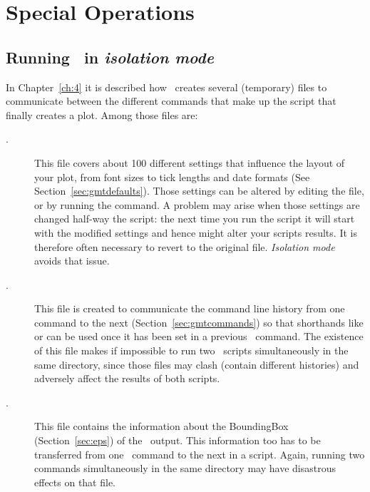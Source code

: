 %
%

\chapter{Special Operations}
\label{app:P}
\thispagestyle{headings}

\section{Running \gmt\ in \emph{isolation mode}}
\label{sec:isolationmode}
In Chapter~\ref{ch:4} it is described how \GMT\ creates several (temporary) files to communicate between the different commands that make up the script that finally creates a plot. Among those files are:
\begin{description}
\item[.] This file covers about 100 different settings that influence the layout of your plot, from font sizes to tick lengths and date formats (See Section~\ref{sec:gmtdefaults}). Those settings can be altered by editing the file, or by running the  command. A problem may arise when those settings are changed half-way the script: the next time you run the script it will start with the modified settings and hence might alter your scripts results. It is therefore often necessary to revert to the original  file. \emph{Isolation mode} avoids that issue.
\item[.] This file is created to communicate the command line history from one command to the next (Section~\ref{sec:gmtcommands}) so that shorthands like  or  can be used once it has been set in a previous \GMT\ command.
The existence of this file makes if impossible to run two \GMT\ scripts simultaneously in the same directory, since those  files may clash (contain different histories) and adversely affect the results of both scripts.
\item[.] This file contains the information about the BoundingBox (Section~\ref{sec:eps}) of the \PS\ output. This information too has to be transferred from one \GMT\ command to the next in a script. Again, running two commands simultaneously in the same directory may have disastrous effects on that file.
\end{description}

